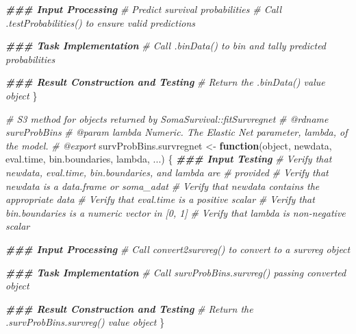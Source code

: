 \documentclass[
]{book}
\newenvironment{Shaded}{\begin{snugshade}}{\end{snugshade}}
\newcommand{\CommentTok}[1]{\textcolor[rgb]{0.56,0.35,0.01}{\textit{#1}}}
\newcommand{\ControlFlowTok}[1]{\textcolor[rgb]{0.13,0.29,0.53}{\textbf{#1}}}
\newcommand{\DocumentationTok}[1]{\textcolor[rgb]{0.56,0.35,0.01}{\textbf{\textit{#1}}}}
\newcommand{\NormalTok}[1]{#1}
\newcommand{\OtherTok}[1]{\textcolor[rgb]{0.56,0.35,0.01}{#1}}
\begin{document}
\begin{Shaded}
\begin{Highlighting}[]
  \DocumentationTok{\#\#\# Input Processing}
  \CommentTok{\# Predict survival probabilities}
  \CommentTok{\# Call .testProbabilities() to ensure valid predictions}
  
  \DocumentationTok{\#\#\# Task Implementation}
  \CommentTok{\# Call \textasciigrave{}.binData()\textasciigrave{} to bin and tally predicted probabilities}
  
  \DocumentationTok{\#\#\# Result Construction and Testing}
  \CommentTok{\# Return the \textasciigrave{}.binData()\textasciigrave{} value object}
\NormalTok{\}}

\CommentTok{\#\textquotesingle{} S3 method for objects returned by \textasciigrave{}SomaSurvival::fitSurvregnet\textasciigrave{}}
\CommentTok{\#\textquotesingle{} @rdname survProbBins}
\CommentTok{\#\textquotesingle{} @param lambda Numeric. The Elastic Net parameter, lambda, of the model. }
\CommentTok{\#\textquotesingle{} @export}
\NormalTok{survProbBins.survregnet }\OtherTok{\textless{}{-}} \ControlFlowTok{function}\NormalTok{(object, newdata, eval.time, bin.boundaries,}
\NormalTok{                                    lambda, ...) \{}
  \DocumentationTok{\#\#\# Input Testing}
  \CommentTok{\# Verify that \textasciigrave{}newdata\textasciigrave{}, \textasciigrave{}eval.time\textasciigrave{}, \textasciigrave{}bin.boundaries\textasciigrave{}, and \textasciigrave{}lambda\textasciigrave{} are }
  \CommentTok{\#   provided}
  \CommentTok{\# Verify that \textasciigrave{}newdata\textasciigrave{} is a data.frame or soma\_adat}
  \CommentTok{\# Verify that \textasciigrave{}newdata\textasciigrave{} contains the appropriate data}
  \CommentTok{\# Verify that \textasciigrave{}eval.time\textasciigrave{} is a positive scalar}
  \CommentTok{\# Verify that \textasciigrave{}bin.boundaries\textasciigrave{} is a numeric vector in [0, 1]}
  \CommentTok{\# Verify that \textasciigrave{}lambda\textasciigrave{} is non{-}negative scalar}
  
  \DocumentationTok{\#\#\# Input Processing}
  \CommentTok{\# Call convert2survreg() to convert to a \textasciigrave{}survreg\textasciigrave{} object}
  
  \DocumentationTok{\#\#\# Task Implementation}
  \CommentTok{\# Call survProbBins.survreg() passing converted object }
  
  \DocumentationTok{\#\#\# Result Construction and Testing}
  \CommentTok{\# Return the \textasciigrave{}.survProbBins.survreg()\textasciigrave{} value object}
\NormalTok{\}}
\end{Highlighting}
\end{Shaded}
\end{document}
